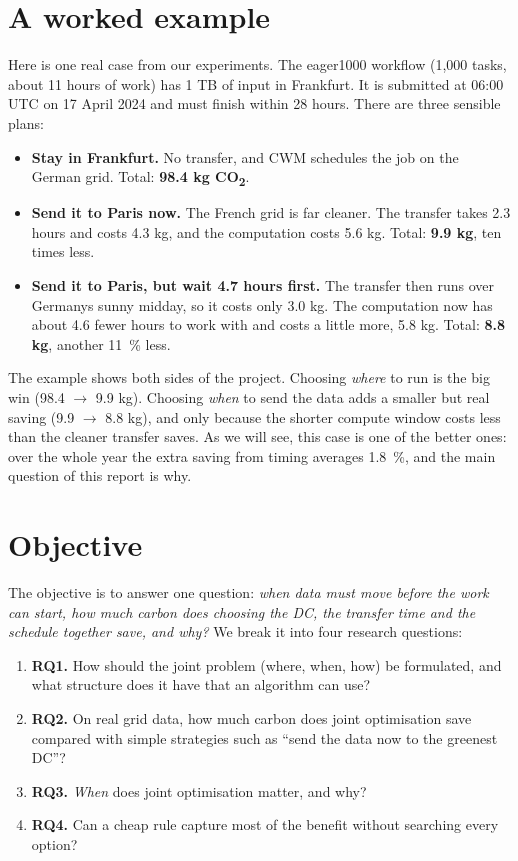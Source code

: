\documentclass[12pt,a4paper,oneside,openany]{report}
\begin{document}
\section{A worked example}\label{sec:1.3}

Here is one real case from our experiments. The eager1000 workflow
(1,000 tasks, about 11 hours of work) has 1 TB of input in Frankfurt. It
is submitted at 06:00 UTC on 17 April 2024 and must finish within 28
hours. There are three sensible plans:

\begin{itemize}
\item
  \textbf{Stay in Frankfurt.} No transfer, and CWM schedules the job on
  the German grid. Total: \textbf{98.4 kg CO\textsubscript{2}}.
\item
  \textbf{Send it to Paris now.} The French grid is far cleaner. The
  transfer takes 2.3 hours and costs 4.3 kg, and the computation costs
  5.6 kg. Total: \textbf{9.9 kg}, ten times less.
\item
  \textbf{Send it to Paris, but wait 4.7 hours first.} The transfer then
  runs over Germany\textquotesingle s sunny midday, so it costs only 3.0
  kg. The computation now has about 4.6 fewer hours to work with and
  costs a little more, 5.8 kg. Total: \textbf{8.8 kg}, another 11~\%
  less.
\end{itemize}

The example shows both sides of the project. Choosing \emph{where} to
run is the big win (98.4 \ensuremath{\rightarrow} 9.9 kg). Choosing \emph{when} to send the
data adds a smaller but real saving (9.9 \ensuremath{\rightarrow} 8.8 kg), and only because the
shorter compute window costs less than the cleaner transfer saves. As we
will see, this case is one of the better ones: over the whole year the
extra saving from timing averages 1.8~\%, and the main question of this
report is why.

\section{Objective}\label{sec:1.4}

The objective is to answer one question: \emph{when data must move
before the work can start, how much carbon does choosing the DC, the
transfer time and the schedule together save, and why?} We break it into
four research questions:

\begin{enumerate}
\def\labelenumi{\arabic{enumi}.}
\item
  \textbf{RQ1.} How should the joint problem (where, when, how) be
  formulated, and what structure does it have that an algorithm can use?
\item
  \textbf{RQ2.} On real grid data, how much carbon does joint
  optimisation save compared with simple strategies such as ``send the
  data now to the greenest DC''?
\item
  \textbf{RQ3.} \emph{When} does joint optimisation matter, and why?
\item
  \textbf{RQ4.} Can a cheap rule capture most of the benefit without
  searching every option?
\end{enumerate}
\end{document}
